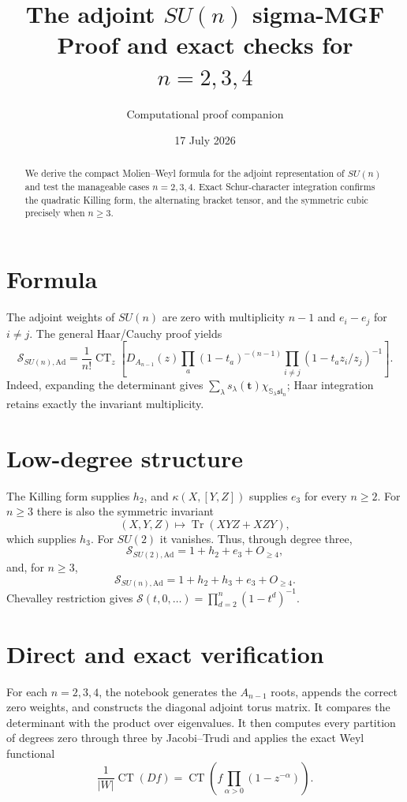 \documentclass[10pt]{article}
\title{\color{navy}\textbf{The adjoint $SU(n)$ sigma-MGF}\\[1mm]\large Proof and exact checks for $n=2,3,4$}
\author{Computational proof companion}\date{17 July 2026}
\newcommand{\Sg}{\mathcal S}\newcommand{\CT}{\operatorname{CT}}
\begin{document}
\maketitle
\begin{abstract}
We derive the compact Molien--Weyl formula for the adjoint representation of
$SU(n)$ and test the manageable cases $n=2,3,4$.  Exact Schur-character
integration confirms the quadratic Killing form, the alternating bracket
tensor, and the symmetric cubic precisely when $n\ge3$.
\end{abstract}

\section{Formula}
The adjoint weights of $SU(n)$ are zero with multiplicity $n-1$ and
$e_i-e_j$ for $i\ne j$.  The general Haar/Cauchy proof yields
\[
 \boxed{\Sg_{SU(n),\mathrm{Ad}}=
 \frac1{n!}\CT_z\left[D_{A_{n-1}}(z)
 \prod_a(1-t_a)^{-(n-1)}
 \prod_{i\ne j}(1-t_a z_i/z_j)^{-1}\right].}
\]
Indeed, expanding the determinant gives
$\sum_\lambda s_\lambda(\mathbf t)\chi_{\mathbb S_\lambda\mathfrak{sl}_n}$;
Haar integration retains exactly the invariant multiplicity.

\section{Low-degree structure}
The Killing form supplies $h_2$, and
$\kappa(X,[Y,Z])$ supplies $e_3$ for every $n\ge2$.  For $n\ge3$ there is also
the symmetric invariant
\[
 (X,Y,Z)\longmapsto\operatorname{Tr}(XYZ+XZY),
\]
which supplies $h_3$.  For $SU(2)$ it vanishes.  Thus, through degree three,
\[
 \Sg_{SU(2),\mathrm{Ad}}=1+h_2+e_3+O_{\ge4},
\]
and, for $n\ge3$,
\[
 \Sg_{SU(n),\mathrm{Ad}}=1+h_2+h_3+e_3+O_{\ge4}.
\]
Chevalley restriction gives
$\Sg(t,0,\ldots)=\prod_{d=2}^n(1-t^d)^{-1}$.

\section{Direct and exact verification}
For each $n=2,3,4$, the notebook generates the $A_{n-1}$ roots, appends the
correct zero weights, and constructs the diagonal adjoint torus matrix.
It compares the determinant with the product over eigenvalues.  It then
computes every partition of degrees zero through three by Jacobi--Trudi and
applies the exact Weyl functional
\[
 \frac1{|W|}\CT(Df)=\CT\left(f\prod_{\alpha>0}(1-z^{-\alpha})\right).
\]
\end{document}
